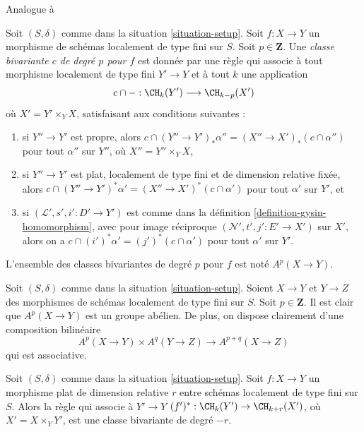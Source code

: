 \begin{definition}
\label{definition-bivariant-class}
\begin{reference}
Analogue à \cite[Définition 17.1]{F}
\end{reference}
Soit $(S, \delta)$ comme dans la situation \ref{situation-setup}.
Soit $f : X \to Y$ un morphisme de schémas localement de type fini sur $S$.
Soit $p \in \mathbf{Z}$.
Une {\it classe bivariante $c$ de degré $p$ pour $f$} est donnée par une règle
qui associe à tout morphisme localement de type fini $Y' \to Y$
et à tout $k$ une application
$$
c \cap - : \CH_k(Y') \longrightarrow \CH_{k - p}(X')
$$
où $X' = Y' \times_Y X$, satisfaisant aux conditions suivantes :
\begin{enumerate}
\item si $Y'' \to Y'$ est propre, alors
$c \cap (Y'' \to Y')_*\alpha'' = (X'' \to X')_*(c \cap \alpha'')$
pour tout $\alpha''$ sur $Y''$, où $X'' = Y'' \times_Y X$,
\item si $Y'' \to Y'$ est plat, localement de type fini et de
dimension relative fixée, alors
$c \cap (Y'' \to Y')^*\alpha' = (X'' \to X')^*(c \cap \alpha')$
pour tout $\alpha'$ sur $Y'$, et
\item si $(\mathcal{L}', s', i' : D' \to Y')$ est comme dans la
définition \ref{definition-gysin-homomorphism},
avec pour image réciproque $(\mathcal{N}', t', j' : E' \to X')$ sur $X'$,
alors on a $c \cap (i')^*\alpha' = (j')^*(c \cap \alpha')$
pour tout $\alpha'$ sur $Y'$.
\end{enumerate}
L'ensemble des classes bivariantes de degré $p$ pour $f$ est
noté $A^p(X \to Y)$.
\end{definition}

\noindent
Soit $(S, \delta)$ comme dans la situation \ref{situation-setup}. Soient $X \to Y$
et $Y \to Z$
des morphismes de schémas localement de type fini sur $S$. Soit
$p \in \mathbf{Z}$. Il est clair que $A^p(X \to Y)$ est un groupe abélien.
De plus, on dispose clairement d'une composition bilinéaire
$$
A^p(X \to Y) \times A^q(Y \to Z) \to A^{p + q}(X \to Z)
$$
qui est associative.

\begin{lemma}
\label{lemma-flat-pullback-bivariant}
Soit $(S, \delta)$ comme dans la situation \ref{situation-setup}.
Soit $f : X \to Y$ un morphisme plat de dimension relative $r$
entre schémas localement de type fini sur $S$.
Alors la règle qui associe à $Y' \to Y$
$(f')^* : \CH_k(Y') \to \CH_{k + r}(X')$, où $X' = X \times_Y Y'$,
est une classe bivariante de degré $-r$.
\end{lemma}

